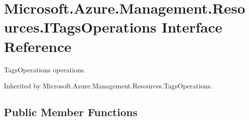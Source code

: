 \hypertarget{interface_microsoft_1_1_azure_1_1_management_1_1_resources_1_1_i_tags_operations}{}\section{Microsoft.\+Azure.\+Management.\+Resources.\+I\+Tags\+Operations Interface Reference}
\label{interface_microsoft_1_1_azure_1_1_management_1_1_resources_1_1_i_tags_operations}


Tags\+Operations operations.  




Inherited by Microsoft.\+Azure.\+Management.\+Resources.\+Tags\+Operations.

\subsection*{Public Member Functions}
